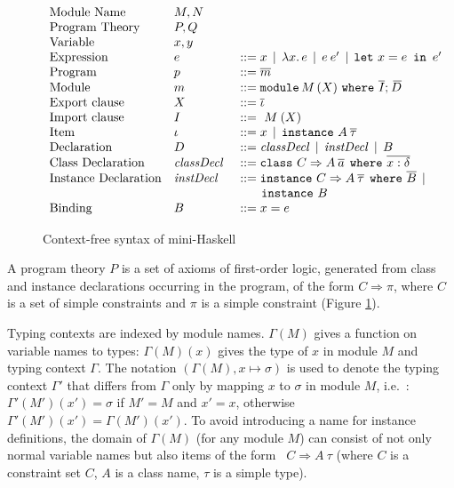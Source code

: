 \begin{figure} 
\[ \begin{array}[c]{lll}
{\rm Module\ Name}          &    M,N            & \\
{\rm Program\ Theory}       &    P,Q            &\\
{\rm Variable}              &    x, y           &\\
{\rm Expression}            &    e              & ::= x \,\mid\, \lambda x.\,e  \,\mid\, e\:e' \,\mid\, \mlet x = e\,\iin\,e'\\ 
{\rm Program}               &    p              & ::= \overline{m}\\
{\rm Module}                &    m              & ::= \module\, M\, (\exportC) \ \where\ \overline{\importC};\: \overline{\!D}\\
{\rm Export\ clause}        &    \exportC\      & ::= \overline{\iitem}\\
{\rm Import\ clause}        &    \importC\      & ::= \ M\: (X)\\
{\rm Item}                  &    \iitem         & ::= x \,\mid\, \instance\ A\: \overline{\tau} \\ 
{\rm Declaration}           &    D              & ::= \classDecl \,\mid\, \instDecl \,\mid\, B\\
{\rm Class\ Declaration}    &    \classDecl\    & ::= \class\ C \Rightarrow A\: \overline{a}\:\: \where\ \overline{x:\delta}\\
{\rm Instance\ Declaration} &    \instDecl\     & ::= \instance\ C \Rightarrow A\: \overline{\tau}\:\: \where\ \overline{B}  \,\mid\, \\
                            &                   & \hspace*{.6cm} \instance\ B\\
{\rm Binding}               &    B              & ::= x = e 
\end{array} \] 
\caption{Context-free syntax of mini-Haskell}
\label{fig:mini-Haskell-context-free-syntax}
\end{figure}

A program theory $P$ is a set of axioms of first-order logic,
generated from class and instance declarations occurring in the
program, of the form $C \Rightarrow \pi$, where $C$ is a set of simple
constraints and $\pi$ is a simple constraint (Figure
\ref{fig:mini-Haskell-context-free-syntax}).

Typing contexts are indexed by module names. $\Gamma(M)$ gives a
function on variable names to types: $\Gamma(M)(x)$ gives the type of
$x$ in module $M$ and typing context $\Gamma$.  The notation
$(\Gamma(M),x \mapsto \sigma)$ is used to denote the typing context
$\Gamma'$ that differs from $\Gamma$ only by mapping $x$ to $\sigma$
in module $M$, i.e.~: $\Gamma'(M')(x') = \sigma$ if $M' = M$ and
$x'=x$, otherwise $\Gamma'(M')(x') = \Gamma(M')(x')$. To avoid
introducing a name for instance definitions, the domain of $\Gamma(M)$
(for any module $M$) can consist of not only normal variable names but
also items of the form {\tt \instance\ $C \Rightarrow A\:\tau$} (where
$C$ is a constraint set $C$, $A$ is a class name, $\tau$ is a simple
type).

